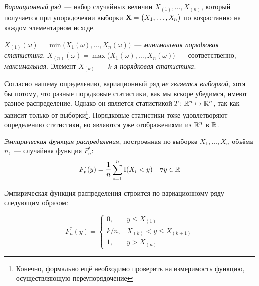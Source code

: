 \begin{defn}
    \textit{Вариационный ряд}~--- набор случайных величин $X_{(1)}, \ldots, X_{(n)}$, который получается при упорядочении выборки $\mathbf{X}= \bigl(X_1, \ldots, X_n \bigr)$ по возрастанию на каждом элементарном исходе. 

    $X_{(1)}(\omega)=\min \bigl(X_{1}(\omega), \ldots, X_{n}(\omega)\bigr)$~--- \textit{минимальная порядковая статистика}, 
    $X_{(n)}(\omega)=\max \bigl(X_{1}(\omega), \ldots, X_{n}(\omega)\bigr)$~--- соответственно, \textit{максимальная}.
    Элемент $X_{(k)}$~--- \textit{$k$-я порядковая статистика}. 
\end{defn}

\begin{rmrk}
    Согласно нашему определению, вариационный ряд \textit{не является выборкой}, хотя бы потому, что разные порядковые статистики, как мы вскоре убедимся, имеют разное распределение.
    Однако он является статистикой $T\colon \mathbb{R}^n \mapsto \mathbb{R}^n$, так как зависит только от выборки\footnote{Конечно, формально ещё необходимо проверить на измеримость функцию, осуществляющую переупорядочение}.
    Порядковые статистики тоже удовлетворяют определению статистики, но являются уже отображениями из $\mathbb{R}^n$ в $\mathbb{R}$.
\end{rmrk}

\begin{defn}
    \textit{Эмпирическая функция распределения}, построенная по выборке $X_{1}, \ldots, X_{n}$ объёма $n$,~--- случайная функция $F_{n}^{*}$:
    \begin{equation*}
        F_{n}^{*}(y) =\frac{1}{n} \sum\limits_{i=1}^{n} \operatorname{\mathrm{I}}(X_{i}<y) \quad \forall y \in \mathbb{R}
    \end{equation*}
\end{defn}

Эмпирическая функция распределения строится по вариационному ряду следующим образом:

\begin{equation*}
    F_{n}^{*}(y)=\left\{\begin{array}{ll}
    0,   & y \leqslant X_{(1)} \\
    k/n, & X_{(k)} < y \leqslant X_{(k+1)} \\
    1,   & y > X_{(n)}
    \end{array}\right.
\end{equation*}


